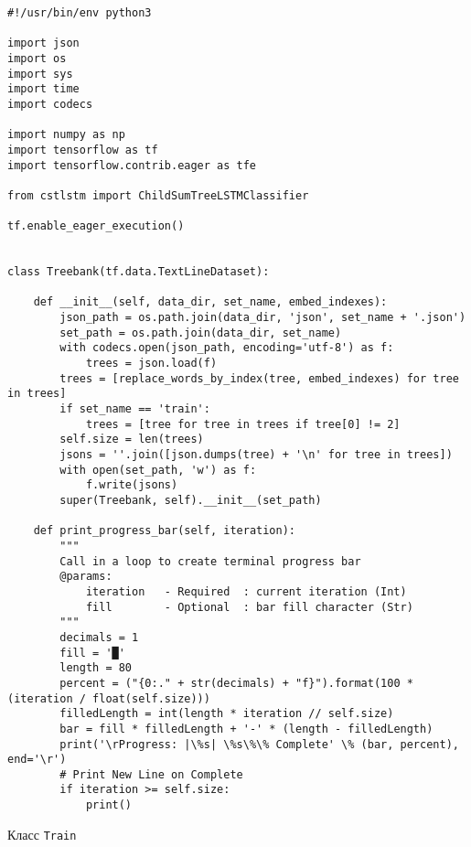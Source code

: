 \begin{lstlisting}[style=app]
#!/usr/bin/env python3

import json
import os
import sys
import time
import codecs

import numpy as np
import tensorflow as tf
import tensorflow.contrib.eager as tfe

from cstlstm import ChildSumTreeLSTMClassifier

tf.enable_eager_execution()


class Treebank(tf.data.TextLineDataset):

    def __init__(self, data_dir, set_name, embed_indexes):
        json_path = os.path.join(data_dir, 'json', set_name + '.json')
        set_path = os.path.join(data_dir, set_name)
        with codecs.open(json_path, encoding='utf-8') as f:
            trees = json.load(f)
        trees = [replace_words_by_index(tree, embed_indexes) for tree in trees]
        if set_name == 'train':
            trees = [tree for tree in trees if tree[0] != 2]
        self.size = len(trees)
        jsons = ''.join([json.dumps(tree) + '\n' for tree in trees])
        with open(set_path, 'w') as f:
            f.write(jsons)
        super(Treebank, self).__init__(set_path)

    def print_progress_bar(self, iteration):
        """
        Call in a loop to create terminal progress bar
        @params:
            iteration   - Required  : current iteration (Int)
            fill        - Optional  : bar fill character (Str)
        """
        decimals = 1
        fill = '█'
        length = 80
        percent = ("{0:." + str(decimals) + "f}").format(100 * (iteration / float(self.size)))
        filledLength = int(length * iteration // self.size)
        bar = fill * filledLength + '-' * (length - filledLength)
        print('\rProgress: |\%s| \%s\%\% Complete' \% (bar, percent), end='\r')
        # Print New Line on Complete
        if iteration >= self.size:
            print()

\end{lstlisting}

\begin{center}Класс \texttt{Train}\end{center}

